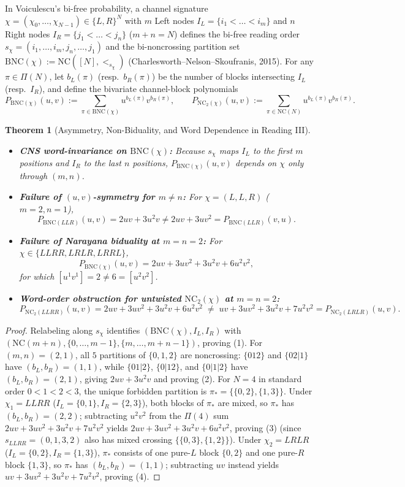 \documentclass[11pt]{article}
\theoremstyle{plain}
\newtheorem{theorem}{Theorem}[section]
\theoremstyle{definition}
\newcommand{\NC}{\mathrm{NC}}
\newcommand{\BNC}{\mathrm{BNC}}
\begin{document}
In Voiculescu's bi-free probability, a channel signature $\chi = (\chi_0, \dots, \chi_{N-1}) \in \{L, R\}^N$ with $m$ Left nodes $I_L = \{i_1 < \dots < i_m\}$ and $n$ Right nodes $I_R = \{j_1 < \dots < j_n\}$ ($m + n = N$) defines the bi-free reading order $s_\chi = (i_1, \dots, i_m, j_n, \dots, j_1)$ and the bi-noncrossing partition set $\BNC(\chi) := \NC([N], <_{s_\chi})$ (Charlesworth--Nelson--Skoufranis, 2015). For any $\pi \in \Pi(N)$, let $b_L(\pi)$ (resp.\ $b_R(\pi)$) be the number of blocks intersecting $I_L$ (resp.\ $I_R$), and define the bivariate channel-block polynomials
\[
  P_{\BNC(\chi)}(u, v) := \sum_{\pi \in \BNC(\chi)} u^{b_L(\pi)} v^{b_R(\pi)}, \qquad
  P_{\NC_2(\chi)}(u, v) := \sum_{\pi \in \NC(N)} u^{b_L(\pi)} v^{b_R(\pi)}.
\]

\begin{theorem}[Asymmetry, Non-Biduality, and Word Dependence in Reading III]\label{thm:bifree-disproof}
\leavevmode
\begin{itemize}\setlength{\itemsep}{2pt}
  \item[(1)] \textbf{CNS word-invariance on $\BNC(\chi)$:} Because $s_\chi$ maps $I_L$ to the first $m$ positions and $I_R$ to the last $n$ positions, $P_{\BNC(\chi)}(u, v)$ depends on $\chi$ only through $(m, n)$.
  \item[(2)] \textbf{Failure of $(u, v)$-symmetry for $m \ne n$:} For $\chi = (L, L, R)$ ($m = 2, n = 1$),
  \[
    P_{\BNC(LLR)}(u, v) = 2uv + 3u^2v \ne 2uv + 3uv^2 = P_{\BNC(LLR)}(v, u).
  \]
  \item[(3)] \textbf{Failure of Narayana biduality at $m = n = 2$:} For $\chi \in \{LLRR, LRLR, LRRL\}$,
  \[
    P_{\BNC(\chi)}(u, v) = 2uv + 3uv^2 + 3u^2v + 6u^2v^2,
  \]
  for which $[u^1 v^1] = 2 \ne 6 = [u^2 v^2]$.
  \item[(4)] \textbf{Word-order obstruction for untwisted $\NC_2(\chi)$ at $m = n = 2$:}
  \[
    P_{\NC_2(LLRR)}(u, v) = 2uv + 3uv^2 + 3u^2v + 6u^2v^2 \;\ne\;
    uv + 3uv^2 + 3u^2v + 7u^2v^2 = P_{\NC_2(LRLR)}(u, v).
  \]
\end{itemize}
\end{theorem}
\begin{proof}
Relabeling along $s_\chi$ identifies $(\BNC(\chi), I_L, I_R)$ with $(\NC(m+n), \{0,\dots,m-1\}, \{m,\dots,m+n-1\})$, proving (1). For $(m, n) = (2, 1)$, all $5$ partitions of $\{0, 1, 2\}$ are noncrossing: $\{012\}$ and $\{02|1\}$ have $(b_L, b_R) = (1, 1)$, while $\{01|2\}$, $\{0|12\}$, and $\{0|1|2\}$ have $(b_L, b_R) = (2, 1)$, giving $2uv + 3u^2v$ and proving (2). For $N = 4$ in standard order $0 < 1 < 2 < 3$, the unique forbidden partition is $\pi_* = \{\{0, 2\}, \{1, 3\}\}$. Under $\chi_1 = LLRR$ ($I_L = \{0, 1\}, I_R = \{2, 3\}$), both blocks of $\pi_*$ are mixed, so $\pi_*$ has $(b_L, b_R) = (2, 2)$; subtracting $u^2v^2$ from the $\Pi(4)$ sum $2uv + 3uv^2 + 3u^2v + 7u^2v^2$ yields $2uv + 3uv^2 + 3u^2v + 6u^2v^2$, proving (3) (since $s_{LLRR} = (0, 1, 3, 2)$ also has mixed crossing $\{\{0,3\},\{1,2\}\}$). Under $\chi_2 = LRLR$ ($I_L = \{0, 2\}, I_R = \{1, 3\}$), $\pi_*$ consists of one pure-$L$ block $\{0, 2\}$ and one pure-$R$ block $\{1, 3\}$, so $\pi_*$ has $(b_L, b_R) = (1, 1)$; subtracting $uv$ instead yields $uv + 3uv^2 + 3u^2v + 7u^2v^2$, proving (4).
\end{proof}
\end{document}
